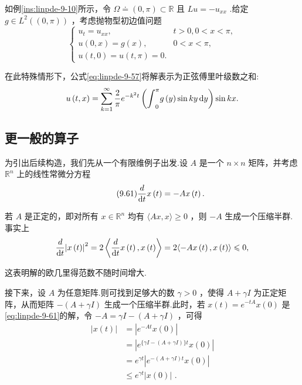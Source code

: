 \begin{instance}\label{ins:linpde-9-20}
如例\ref{ins:linpde-9-10}所示，令 $\Omega  \doteq  ( 0,\pi )  \subset  \mathbb{R}$ 且 ${Lu} =  - {u}_{xx}$ .给定 $g \in  {L}^{2}\left( {( 0,\pi ) }\right)$ ，考虑抛物型初边值问题
\[
\begin{cases} {u}_{t}= {u}_{xx}, & t > 0,0 < x < \pi , \\  u\left( {0,x}\right)= g\left( x\right) , & 0 < x < \pi , \\  u\left( {t,0}\right) = u\left( {t,\pi }\right)  = 0. &  \end{cases}
\]

在此特殊情形下，公式\eqref{eq:linpde-9-57}将解表示为正弦傅里叶级数之和:
\[
u\left( {t,x}\right)  = \sum_{{k = 1}}^{\infty }\frac{2}{\pi }{e}^{-{k}^{2}t}\left( {{\int }_{0}^{\pi }g\left( y\right) \sin {ky\mathop{}\!\mathrm{d}y}}\right) \sin {kx}.
\]
\end{instance}

\subsection{更一般的算子}
为引出后续构造，我们先从一个有限维例子出发.设 $A$ 是一个 $n \times  n$ 矩阵，并考虑 ${\mathbb{R}}^{n}$ 上的线性常微分方程
\begin{equation}\tag{9.61}\label{eq:linpde-9-61}
\frac{d}{\mathop{}\!\mathrm{d} t}x\left( t\right)  =  - {Ax}\left( t\right) .
\end{equation}

若 $A$ 是正定的，即对所有 $x \in  {\mathbb{R}}^{n}$ 均有 $\langle {Ax},x\rangle  \geq  0$ ，则 $- A$ 生成一个压缩半群.事实上
\[
\frac{d}{\mathop{}\!\mathrm{d} t}{\left| x\left( t\right) \right| }^{2} = 2\left\langle  {\frac{d}{\mathop{}\!\mathrm{d}t}x\left( t\right) ,x\left( t\right) }\right\rangle   = 2\langle  - {Ax}\left( t\right) ,x\left( t\right) \rangle  \leqslant  0,
\]

这表明解的欧几里得范数不随时间增大.

接下来，设 $A$ 为任意矩阵.则可找到足够大的数 $\gamma  > 0$ ，使得 $A + {\gamma I}$ 为正定矩阵，从而矩阵 $- \left( {A + {\gamma I}}\right)$ 生成一个压缩半群.此时，若 $x\left( t\right)  = {e}^{-{tA}}x\left( 0\right)$ 是\eqref{eq:linpde-9-61}的解，令 $- A = {\gamma I} - \left( {A + {\gamma I}}\right)$ ，可得
\begin{equation}\tag{9.62}\label{eq:linpde-9-62}
\begin{aligned}
\left| {x\left( t\right) }\right|  &= \left| {{e}^{-{At}}x\left( 0\right) }\right| \\
&= \left| {{e}^{\{ {\gamma I} - \left( {A + {\gamma I}}\right) \} t}x\left( 0\right) }\right| \\
&= {e}^{\gamma t}\left| {{e}^{-\left( {A + {\gamma I}}\right) t}x\left( 0\right) }\right| \\
&\leq  {e}^{\gamma t}\left| {x\left( 0\right) }\right| \text{ . }
\end{aligned}
\end{equation}

